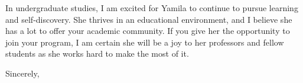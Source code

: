 \documentclass[11pt, letterpaper]{letter} %
\begin{document}
\begin{letter}
In undergraduate studies, I am excited for Yamila to continue to pursue learning and self-discovery. She thrives in an educational environment, and I believe she has a lot to offer your academic community. If you give her the opportunity to join your program, I am certain she will be a joy to her professors and fellow students as she works hard to make the most of it.


\closing{Sincerely,}




\end{letter}
\end{document}
